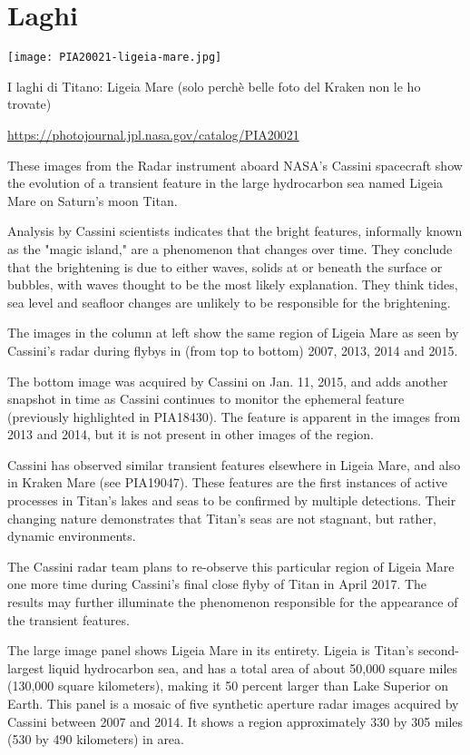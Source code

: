 \documentclass[a4paper,10pt,openany,oneside]{memoir}
\begin{document}
\section{Laghi}

\texttt{[image: PIA20021-ligeia-mare.jpg]}

I laghi di Titano: Ligeia Mare (solo perchè belle foto del Kraken non le ho trovate)

\url{https://photojournal.jpl.nasa.gov/catalog/PIA20021}


These images from the Radar instrument aboard NASA's Cassini spacecraft show the evolution of a transient feature in the large hydrocarbon sea named Ligeia Mare on Saturn's moon Titan.

Analysis by Cassini scientists indicates that the bright features, informally known as the "magic island," are a phenomenon that changes over time. They conclude that the brightening is due to either waves, solids at or beneath the surface or bubbles, with waves thought to be the most likely explanation. They think tides, sea level and seafloor changes are unlikely to be responsible for the brightening.

The images in the column at left show the same region of Ligeia Mare as seen by Cassini's radar during flybys in (from top to bottom) 2007, 2013, 2014 and 2015.

The bottom image was acquired by Cassini on Jan. 11, 2015, and adds another snapshot in time as Cassini continues to monitor the ephemeral feature (previously highlighted in PIA18430). The feature is apparent in the images from 2013 and 2014, but it is not present in other images of the region.

Cassini has observed similar transient features elsewhere in Ligeia Mare, and also in Kraken Mare (see PIA19047). These features are the first instances of active processes in Titan's lakes and seas to be confirmed by multiple detections. Their changing nature demonstrates that Titan's seas are not stagnant, but rather, dynamic environments.

The Cassini radar team plans to re-observe this particular region of Ligeia Mare one more time during Cassini's final close flyby of Titan in April 2017. The results may further illuminate the phenomenon responsible for the appearance of the transient features.

The large image panel shows Ligeia Mare in its entirety. Ligeia is Titan's second-largest liquid hydrocarbon sea, and has a total area of about 50,000 square miles (130,000 square kilometers), making it 50 percent larger than Lake Superior on Earth. This panel is a mosaic of five synthetic aperture radar images acquired by Cassini between 2007 and 2014. It shows a region approximately 330 by 305 miles (530 by 490 kilometers) in area.
\end{document}
